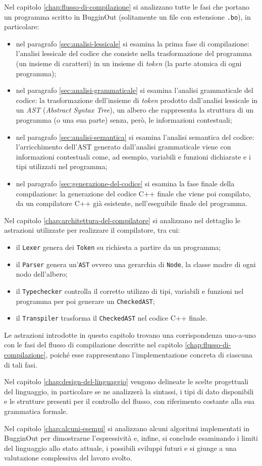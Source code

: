 Nel capitolo \ref{chap:flusso-di-compilazione} si analizzano tutte le fasi che portano un programma scritto in BugginOut (solitamente un file con estensione \texttt{.bo}), in particolare:
\begin{itemize}
	\item nel paragrafo \ref{sec:analisi-lessicale} si esamina la prima fase di compilazione: l'analisi lessicale del codice che consiste nella trasformazione del programma (un insieme di caratteri) in un insieme di \emph{token} (la parte atomica di ogni programma);
	\item nel paragrafo \ref{sec:analisi-grammaticale} si esamina l'analisi grammaticale del codice: la trasformazione dell'insieme di \emph{token} prodotto dall'analisi lessicale in un \emph{AST} (\textit{Abstract Syntax Tree}), un albero che rappresenta la struttura di un programma (o una sua parte) senza, per\`o, le informazioni contestuali;
	\item nel paragrafo \ref{sec:analisi-semantica} si esamina l'analisi semantica del codice: l'arricchimento dell'AST generato dall'analisi grammaticale viene con informazioni contestuali come, ad esempio, variabili e funzioni dichiarate e i tipi utilizzati nel programma;
	\item nel paragrafo \ref{sec:generazione-del-codice} si esamina la fase finale della compilazione: la generazione del codice C++ finale che viene poi compilato, da un compilatore C++ gi\`a esistente, nell'eseguibile finale del programma.
\end{itemize}
Nel capitolo \ref{chap:architettura-del-compilatore} si analizzano nel dettaglio le astrazioni utilizzate per realizzare il compilatore, tra cui:
\begin{itemize}
	\item il \texttt{Lexer} genera dei \texttt{Token} su richiesta a partire da un programma;
	\item il \texttt{Parser} genera un'\texttt{AST} ovvero una gerarchia di \texttt{Node}, la classe madre di ogni nodo dell'albero;
	\item il \texttt{Typechecker} controlla il corretto utilizzo di tipi, variabili e funzioni nel programma per poi generare un \texttt{CheckedAST};
	\item il \texttt{Transpiler} trasforma il \texttt{CheckedAST} nel codice C++ finale.
\end{itemize}
Le astrazioni introdotte in questo capitolo trovano una corrispondenza uno-a-uno con le fasi del flusso di compilazione descritte nel capitolo \ref{chap:flusso-di-compilazione}, poiché esse rappresentano l’implementazione concreta di ciascuna di tali fasi.

Nel capitolo \ref{chap:design-del-linguaggio} vengono delineate le scelte progettuali del linguaggio, in particolare se ne analizzer\`a la sintassi, i tipi di dato disponibili e le strutture presenti per il controllo del flusso, con riferimento costante alla sua grammatica formale.

Nel capitolo \ref{chap:alcuni-esempi} si analizzano alcuni algoritmi implementati in BugginOut per dimostrarne l'espressivit\`a e, infine, si conclude esaminando i limiti del linguaggio allo stato attuale, i possibili sviluppi futuri e si giunge a una valutazione complessiva del lavoro svolto.
